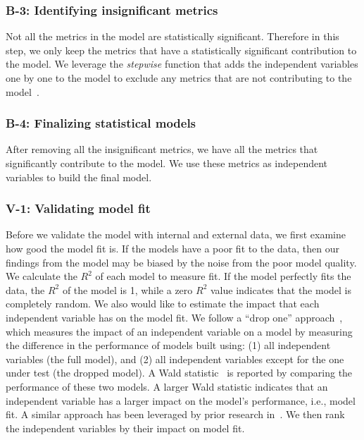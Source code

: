 \subsubsection{B-3: Identifying insignificant metrics}
Not all the metrics in the model are statistically significant. Therefore in this step, we only keep the metrics that have a statistically significant contribution to the model. We leverage the \textit{stepwise} function that adds the independent variables one by one to the model to exclude any metrics that are not contributing to the model~\cite{RInAction}. 

\subsubsection{B-4: Finalizing statistical models}
After removing all the insignificant metrics, we have all the metrics that significantly contribute to the model. We use these metrics as independent variables to build the final model.

\subsubsection{V-1: Validating model fit}

Before we validate the model with internal and external data, we first examine how good the model fit is. If the models have a poor fit to the data, then our findings from the model may be biased by the noise from the poor model quality. We calculate the $R^2$ of each model to measure fit. If the model perfectly fits the data, the $R^2$ of the model is 1, while a zero $R^2$ value indicates that the model is completely random. We also would like to estimate the impact that each independent variable has on the model fit. We follow a ``drop one'' approach~\cite{Chambers1990}, which measures the impact of an independent variable on a model by measuring the difference in the performance of models built using: (1) all independent variables (the full model), and (2) all independent variables except for the one under test (the dropped model). A Wald statistic~\cite{harrell2015regression} is reported by comparing the performance of these two models. A larger Wald statistic indicates that an independent variable has a larger impact on the model's performance, i.e., model fit. A similar approach has been leveraged by prior research in~\cite{mcintosh2015emse}. We then rank the independent variables by their impact on model fit. 


